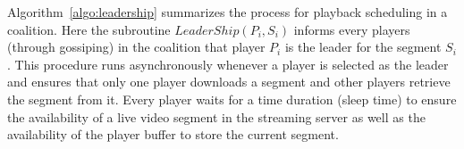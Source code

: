 Algorithm~\ref{algo:leadership} summarizes the process for playback scheduling in a coalition. 
Here the subroutine $LeaderShip(P_i, S_i)$ informs every players (through gossiping) in the coalition that player $P_i$ is the leader for the segment $S_i$. This procedure runs asynchronously whenever a player is selected as the leader and ensures that only one player downloads a segment and other players retrieve the segment from it. 
Every player waits for a time duration (sleep time) to ensure the availability of a live video segment in the streaming server as well as the availability of the player buffer to store the current segment. 
